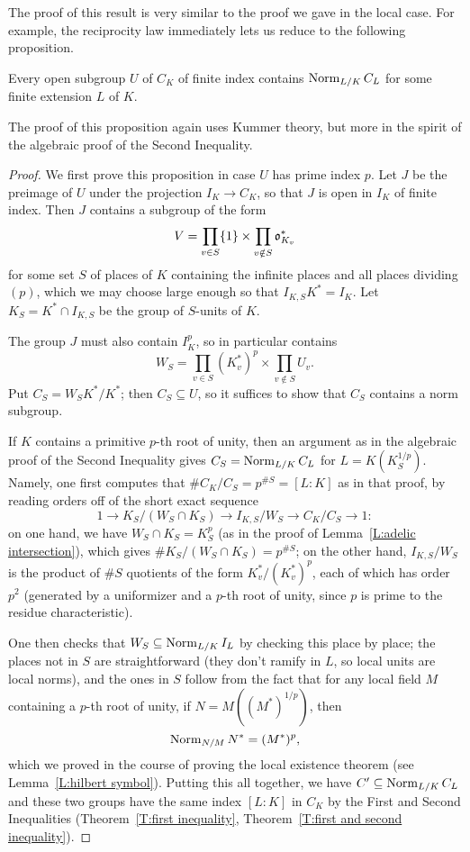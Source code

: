 The proof of this result is very similar to the proof we gave in 
the local case. For example, the reciprocity law immediately lets us reduce
to the following proposition.
\begin{prop}
Every open subgroup $U$ of $C_K$ of finite index contains 
$\operatorname{Norm}_{L/K} C_L$ for some finite extension $L$ of $K$.
\end{prop}
The proof of this proposition again uses Kummer theory, but more in the spirit of the algebraic proof of the Second Inequality.
\begin{proof}
We first prove this proposition in case $U$ has prime index $p$.
Let $J$ be the preimage of $U$ under the projection
$I_K \to C_K$, so that $J$ is open in $I_K$ of finite index.
Then $J$ contains a subgroup of the form
\[
V = \prod_{v \in S} \{1\} \times \prod_{v \notin S} \mathfrak{o}_{K_v}^*
\]
for some set $S$ of places of $K$ containing
the infinite places and all places dividing $(p)$, which we may choose
large enough so that $I_{K,S} K^* = I_K$. Let $K_S = K^* \cap I_{K,S}$
be the group of $S$-units of $K$.

The group $J$ must also contain
$I_K^p$, so in particular contains
\[
W_S = \prod_{v \in S} (K_v^*)^p \times \prod_{v \notin S} U_v.
\]
Put $C_S = W_S K^*/K^*$; then $C_S \subseteq U$, so it suffices to show that
$C_S$ contains a norm subgroup.

If $K$ contains a primitive $p$-th root of unity, then an argument
as in the algebraic proof of the Second Inequality gives
$C_{S} = \operatorname{Norm}_{L/K} C_L$ for $L = K(K_S^{1/p})$.
Namely, one first computes that $\#C_K/C_S = p^{\#S} = [L:K]$
as in that proof, by reading orders off of the short exact sequence
\[
1 \to K_S / (W_S \cap K_S) \to I_{K,S}/{W_S} \to C_K /C_S \to 1:
\]
on one hand, we have $W_S \cap K_S = K_S^p$ (as in the proof of Lemma~\ref{L:adelic intersection}),
which gives $\#K_S/(W_S \cap K_S) = p^{\#S}$; on the other hand,
$I_{K,S}/W_S$ is the product of $\#S$ quotients of the form
$K_v^*/(K_v^*)^p$, each of which has order $p^2$ (generated by a uniformizer
and a $p$-th root of unity, since $p$ is prime to the residue characteristic).

One then checks that $W_S \subseteq \operatorname{Norm}_{L/K} I_L$ by checking this
place by place; the places not in $S$ are straightforward (they don't
ramify in $L$, so local units are local norms), and the
ones in $S$ follow from the fact that for any local field $M$
containing a $p$-th root of unity,
if $N = M((M^*)^{1/p})$, then
\[
\operatorname{Norm}_{N/M} N^* = (M^*)^p,
\]
which we proved in the course of proving the local existence theorem
(see Lemma~\ref{L:hilbert symbol}).
Putting this all together, we have
$C' \subseteq \operatorname{Norm}_{L/K} C_L$ and these two groups have the same index
$[L:K]$ in $C_K$ by the First and Second Inequalities
(Theorem~\ref{T:first inequality}, Theorem~\ref{T:first and second inequality}).


\end{proof}
